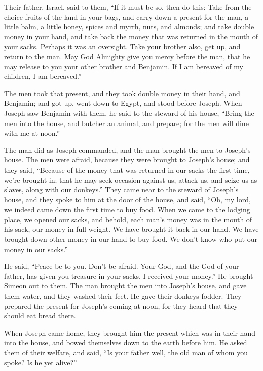  Their father, Israel, said to them, ``If it must be so,
then do this: Take from the choice fruits of the land in your bags, and
carry down a present for the man, a little balm, a little honey, spices
and myrrh, nuts, and almonds;  and take double money in
your hand, and take back the money that was returned in the mouth of
your sacks. Perhaps it was an oversight.  Take your brother
also, get up, and return to the man.  May God Almighty give
you mercy before the man, that he may release to you your other brother
and Benjamin. If I am bereaved of my children, I am bereaved.''

 The men took that present, and they took double money in
their hand, and Benjamin; and got up, went down to Egypt, and stood
before Joseph.  When Joseph saw Benjamin with them, he said
to the steward of his house, ``Bring the men into the house, and butcher
an animal, and prepare; for the men will dine with me at noon.''

 The man did as Joseph commanded, and the man brought the
men to Joseph's house.  The men were afraid, because they
were brought to Joseph's house; and they said, ``Because of the money
that was returned in our sacks the first time, we're brought in; that he
may seek occasion against us, attack us, and seize us as slaves, along
with our donkeys.''  They came near to the steward of
Joseph's house, and they spoke to him at the door of the house,
 and said, ``Oh, my lord, we indeed came down the first
time to buy food.  When we came to the lodging place, we
opened our sacks, and behold, each man's money was in the mouth of his
sack, our money in full weight. We have brought it back in our hand.
 We have brought down other money in our hand to buy food.
We don't know who put our money in our sacks.''

 He said, ``Peace be to you. Don't be afraid. Your God, and
the God of your father, has given you treasure in your sacks. I received
your money.'' He brought Simeon out to them.  The man
brought the men into Joseph's house, and gave them water, and they
washed their feet. He gave their donkeys fodder.  They
prepared the present for Joseph's coming at noon, for they heard that
they should eat bread there.

 When Joseph came home, they brought him the present which
was in their hand into the house, and bowed themselves down to the earth
before him.  He asked them of their welfare, and said, ``Is
your father well, the old man of whom you spoke? Is he yet alive?''

